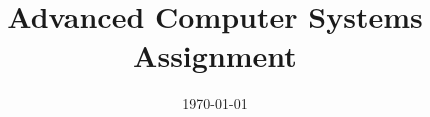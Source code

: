 \documentclass[10pt,a4paper]{article}
\title
{
    Advanced Computer Systems \\
    {\Large Assignment \assignmentnumber}
}
\author
{
    \authform{Hans J. T. Stephensen}{xkv467}
    \and
    \authform{Casper B. Hansen}{fvx507}
}
\date{\today}
\newcommand{\colbreak}{{\ }\vfill\columnbreak}
\begin{document}
\clearpage
\maketitle
\thispagestyle{empty}

\setlength{\columnsep}{0pt}
\begin{multicols}{2}
    \colbreak
    \tableofcontents
\end{multicols}
\setlength{\columnsep}{10pt}
\clearpage




\end{document}
